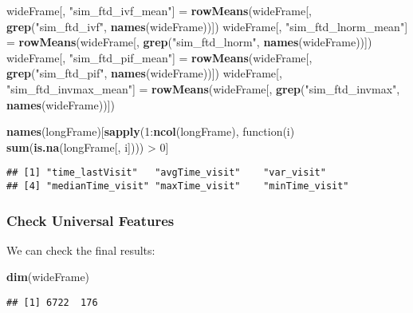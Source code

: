 \documentclass[10pt]{report}
\newenvironment{Shaded}{}{}
\newcommand{\KeywordTok}[1]{\textcolor[rgb]{0.00,0.44,0.13}{\textbf{{#1}}}}
\newcommand{\DecValTok}[1]{\textcolor[rgb]{0.25,0.63,0.44}{{#1}}}
\newcommand{\StringTok}[1]{\textcolor[rgb]{0.25,0.44,0.63}{{#1}}}
\newcommand{\NormalTok}[1]{{#1}}
\begin{document}
\begin{Shaded}
\begin{Highlighting}[]
\NormalTok{wideFrame[, }\StringTok{"sim_ftd_ivf_mean"}\NormalTok{] =}\StringTok{ }\KeywordTok{rowMeans}\NormalTok{(wideFrame[, }\KeywordTok{grep}\NormalTok{(}\StringTok{"sim_ftd_ivf"}\NormalTok{, }\KeywordTok{names}\NormalTok{(wideFrame))])}
\NormalTok{wideFrame[, }\StringTok{"sim_ftd_lnorm_mean"}\NormalTok{] =}\StringTok{ }\KeywordTok{rowMeans}\NormalTok{(wideFrame[, }\KeywordTok{grep}\NormalTok{(}\StringTok{"sim_ftd_lnorm"}\NormalTok{, }
    \KeywordTok{names}\NormalTok{(wideFrame))])}
\NormalTok{wideFrame[, }\StringTok{"sim_ftd_pif_mean"}\NormalTok{] =}\StringTok{ }\KeywordTok{rowMeans}\NormalTok{(wideFrame[, }\KeywordTok{grep}\NormalTok{(}\StringTok{"sim_ftd_pif"}\NormalTok{, }\KeywordTok{names}\NormalTok{(wideFrame))])}
\NormalTok{wideFrame[, }\StringTok{"sim_ftd_invmax_mean"}\NormalTok{] =}\StringTok{ }\KeywordTok{rowMeans}\NormalTok{(wideFrame[, }\KeywordTok{grep}\NormalTok{(}\StringTok{"sim_ftd_invmax"}\NormalTok{, }
    \KeywordTok{names}\NormalTok{(wideFrame))])}

\KeywordTok{names}\NormalTok{(longFrame)[}\KeywordTok{sapply}\NormalTok{(}\DecValTok{1}\NormalTok{:}\KeywordTok{ncol}\NormalTok{(longFrame), function(i) }\KeywordTok{sum}\NormalTok{(}\KeywordTok{is.na}\NormalTok{(longFrame[, }
    \NormalTok{i]))) >}\StringTok{ }\DecValTok{0}\NormalTok{]}
\end{Highlighting}
\end{Shaded}

\begin{verbatim}
## [1] "time_lastVisit"   "avgTime_visit"    "var_visit"       
## [4] "medianTime_visit" "maxTime_visit"    "minTime_visit"
\end{verbatim}

\subsubsection{Check Universal Features}\label{check-universal-features}

We can check the final results:

\begin{Shaded}
\begin{Highlighting}[]
\KeywordTok{dim}\NormalTok{(wideFrame)}
\end{Highlighting}
\end{Shaded}

\begin{verbatim}
## [1] 6722  176
\end{verbatim}
\end{document}
